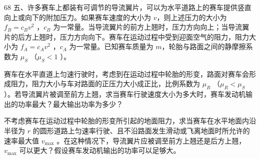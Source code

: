 \begin{problem}[33届物理竞赛决赛]{68}
    五、许多赛车上都装有可调节的导流翼片，可以为水平道路上的赛车提供竖直向上或向下的附加压力。如果赛车速度的大小为 $v$，则上述压力的大小为 $f_{B} = c_{B} v^{2}$ ，$c_{B}$ 为一常量。当导流翼片的前方上翘时，压力方向向上；当导流翼片的后方上翘时，压力方向向下。赛车在运动过程中受到迎面空气的阻力，阻力大小为 $f_{A} = c_{A} v^{2}$ ，$c_{A}$ 为一常量。已知赛车质量为 $m$，轮胎与路面之间的静摩擦系数为 $\mu_{S}$ （$\mu_{S}<1$ ）。
    \begin{subproblem}
        赛车在水平直道上匀速行驶时，考虑到在运动过程中轮胎的形变，路面对赛车会形成阻力，阻力大小与车对路面的正压力大小成正比，比例系数为 $\mu_{R}$ （$\mu_{R} < \mu_{S}$ ）。若导流翼片被调至前方上翘，求当赛车行驶速度大小为多大时，赛车发动机输出的功率最大？最大输出功率为多少？
    \end{subproblem}
    \begin{subproblem}
        不考虑赛车在运动过程中轮胎的形变所引起的地面阻力，求当赛车在水平地面内沿半径为 $r$ 的圆形道路上匀速率行驶、且不沿路面发生滑动或飞离地面时所允许的速率最大值 $v_{\max}$ 。在这种情况下，导流翼片应被调至前方上翘还是后方上翘，$v_{\max}$ 可以更大？假设赛车发动机输出的功率可以足够大。
    \end{subproblem}
\end{problem}